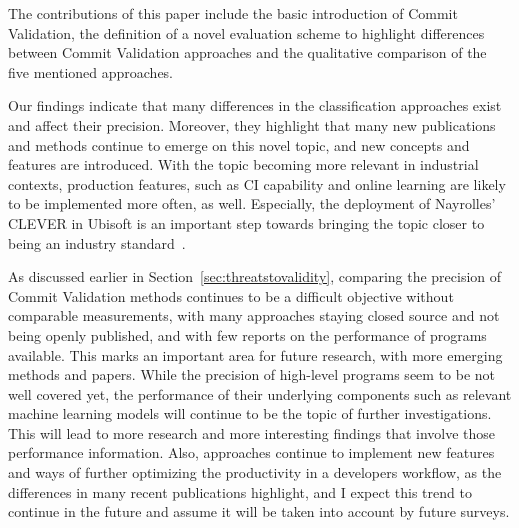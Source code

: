 The contributions of this paper include the basic introduction of Commit Validation, the definition of a novel evaluation scheme to highlight differences between Commit Validation approaches and the qualitative comparison of the five mentioned approaches.

Our findings indicate that many differences in the classification approaches exist and affect their precision. Moreover, they highlight that many new publications and methods continue to emerge on this novel topic, and new concepts and features are introduced. With the topic becoming more relevant in industrial contexts, production features, such as CI capability and online learning are likely to be implemented more often, as well. Especially, the deployment of Nayrolles' CLEVER in Ubisoft is an important step towards bringing the topic closer to being an industry standard~\cite{Nayrolles2018}.

As discussed earlier in Section~\ref{sec:threatstovalidity}, %
comparing the precision of Commit Validation methods continues to be a difficult objective without comparable measurements, with many approaches staying closed source and not being openly published, and with few reports on the performance of programs available. This marks an important area for future research, with more emerging methods and papers. 
While the precision of high-level programs seem to be not well covered yet, the performance of their underlying components such as relevant machine learning models will continue to be the topic of further investigations. This will lead to more research and more interesting findings that involve those performance information.
Also, approaches continue to implement new features and ways of further optimizing the productivity in a developers workflow, as the differences in many recent publications highlight, 
and I expect this trend to continue in the future and assume it will be taken into account by future surveys.
